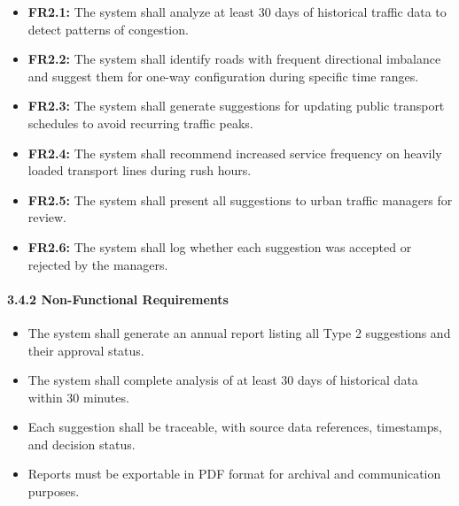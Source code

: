 \begin{itemize}
    \item \textbf{FR2.1:} The system shall analyze at least 30 days of historical traffic data to detect patterns of congestion.
    \item \textbf{FR2.2:} The system shall identify roads with frequent directional imbalance and suggest them for one-way configuration during specific time ranges.
    \item \textbf{FR2.3:} The system shall generate suggestions for updating public transport schedules to avoid recurring traffic peaks.
    \item \textbf{FR2.4:} The system shall recommend increased service frequency on heavily loaded transport lines during rush hours.
    \item \textbf{FR2.5:} The system shall present all suggestions to urban traffic managers for review.
    \item \textbf{FR2.6:} The system shall log whether each suggestion was accepted or rejected by the managers.
\end{itemize}

\paragraph{3.4.2 Non-Functional Requirements}

\begin{itemize}
    \item The system shall generate an annual report listing all Type 2 suggestions and their approval status.
    \item The system shall complete analysis of at least 30 days of historical data within 30 minutes.
    \item Each suggestion shall be traceable, with source data references, timestamps, and decision status.
    \item Reports must be exportable in PDF format for archival and communication purposes.
\end{itemize}
